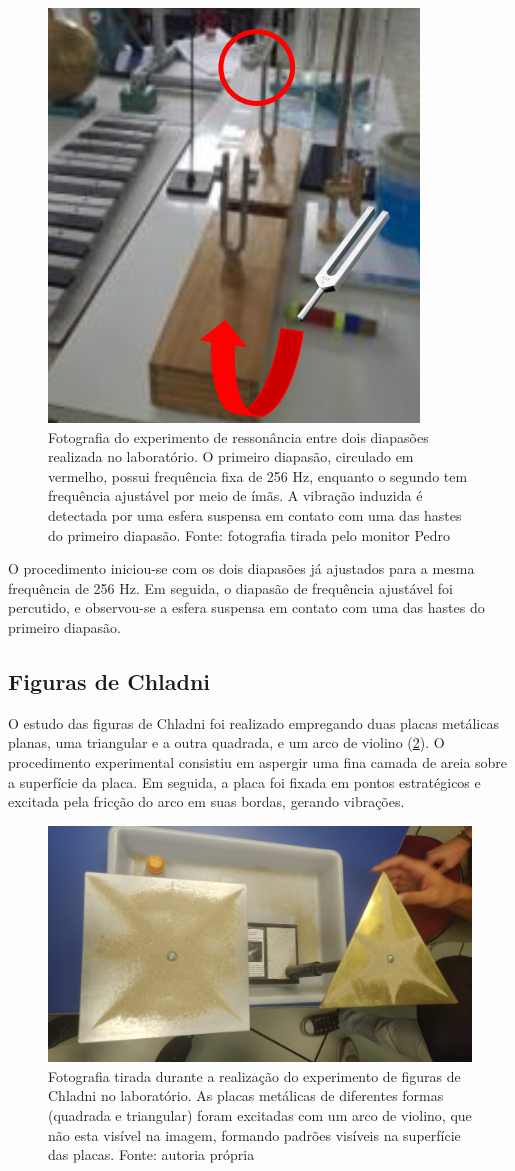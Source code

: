 \begin{figure}[H]
    \centering
    \includegraphics[width=0.25\linewidth]{fig/ressonacia.png}
    \caption{Fotografia do experimento de ressonância entre dois diapasões realizada no laboratório. O primeiro diapasão, circulado em vermelho, possui frequência fixa de 256 Hz, enquanto o segundo tem frequência ajustável por meio de ímãs. A vibração induzida é detectada por uma esfera suspensa em contato com uma das hastes do primeiro diapasão. Fonte: fotografia tirada pelo monitor Pedro}
    \label{fig:ressonancia}
\end{figure}

O procedimento iniciou-se com os dois diapasões já ajustados para a mesma frequência de 256 Hz. Em seguida, o diapasão de frequência ajustável foi percutido, e observou-se a esfera suspensa em contato com uma das hastes do primeiro diapasão. 

\subsection{Figuras de Chladni}
O estudo das figuras de Chladni foi realizado empregando duas placas metálicas planas, uma triangular e a outra quadrada, e um arco de violino (\cref{fig:chladni}). O procedimento experimental consistiu em aspergir uma fina camada de areia sobre a superfície da placa. Em seguida, a placa foi fixada em pontos estratégicos e excitada pela fricção do arco em suas bordas, gerando vibrações.

\begin{figure}[H]
    \centering
    \includegraphics[width=0.35\linewidth]{fig/chladni.png.jpg}
    \caption{Fotografia tirada durante a realização do experimento de figuras de Chladni no laboratório. As placas metálicas de diferentes formas (quadrada e triangular) foram excitadas com um arco de violino, que não esta visível na imagem, formando padrões visíveis na superfície das placas. Fonte: autoria própria}
    \label{fig:chladni}
\end{figure}


